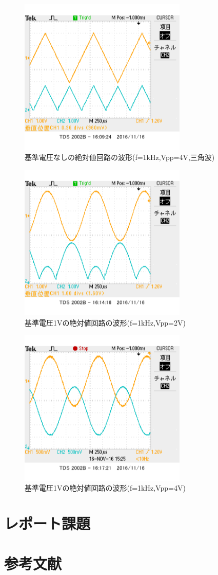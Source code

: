 \documentclass[11pt,a4j]{jsarticle}
\begin{document}
    
    \begin{figure}[htbp]
  \centering
  \includegraphics[width=8cm,clip]{2_abs_Vr0_f1V4sankaku_ViVo.png}
  \caption{基準電圧なしの絶対値回路の波形(f=1kHz,Vpp=4V,三角波)}
  \label{fig:2_Vr0_sankaku}
 \end{figure}%
  
  \begin{figure}[htbp]
  \centering
  \includegraphics[width=8cm,clip]{2_abs_Vr1_f1V2sin_ViVo.png}
  \caption{基準電圧1Vの絶対値回路の波形(f=1kHz,Vpp=2V)}
  \label{fig:2_Vr1_2}
 \end{figure}%
  
  
  \begin{figure}[htbp]
  \centering
  \includegraphics[width=8cm,clip]{2_abs_Vr1_f1V4sin_ViVo.png}
  \caption{基準電圧1Vの絶対値回路の波形(f=1kHz,Vpp=4V)}
  \label{fig:2_Vr1_4}
 \end{figure}%
  
  
  \clearpage
  
 \section{レポート課題} 
  
  
 \section{参考文献}
  
  
  
\end{document}
